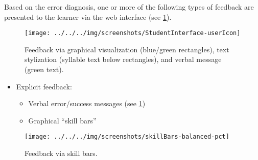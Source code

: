 \documentclass[a0,portrait]{a0poster}
\newcommand{\headingcolor}{\color{BannerSixColor}}
\def\Highlight#1{{\sffamily \headingcolor #1}}
\begin{document}
\begin{textblock}{7}
\begin{textblock}{7}
  Based on the error diagnosis, one or more of the following types of feedback are presented to the learner via the web interface (see \cref{fig:feedback}). 

\vspace{1em}

	\begin{figure}
	\centering
	\texttt{[image: ../../../img/screenshots/StudentInterface-userIcon]}
	\caption{Feedback via graphical visualization (blue/green rectangles), text stylization (syllable text below rectangles), 
	and verbal message (green text).}
	\label{fig:feedback}
	\end{figure}
  

  
  \begin{itemize}
	  \item{\Highlight{Explicit feedback}:
	  	\begin{itemize}
	  		\item{Verbal error/success messages (see \cref{fig:feedback})}
	  		\item{Graphical ``skill bars'' %
	  		}
	  	\end{itemize}
	  }
  \end{itemize}
  
  \begin{figure}
  	\centering
	\texttt{[image: ../../../img/screenshots/skillBars-balanced-pct]}
	\caption{Feedback via skill bars.}
  \end{figure}
  

\end{textblock}
\end{textblock}
\end{document}
